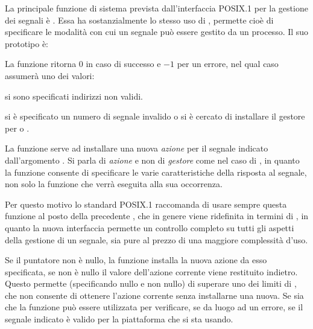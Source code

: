 La principale funzione di sistema prevista dall'interfaccia POSIX.1 per la
gestione dei segnali è . Essa ha sostanzialmente lo stesso
uso di , permette cioè di specificare le modalità con cui un
segnale può essere gestito da un processo. Il suo prototipo è:

\begin{funcproto}{
}

{La funzione ritorna $0$ in caso di successo e $-1$ per un errore, nel qual
  caso  assumerà uno dei valori: 
  \begin{errlist}
  \item[\errcode{EFAULT}] si sono specificati indirizzi non validi.
  \item[\errcode{EINVAL}] si è specificato un numero di segnale invalido o si è
    cercato di installare il gestore per  o
    .
  \end{errlist}
}
\end{funcproto}

La funzione serve ad installare una nuova \textsl{azione} per il segnale
indicato dall'argomento . Si parla di \textsl{azione} e non di
\textsl{gestore} come nel caso di , in quanto la funzione
consente di specificare le varie caratteristiche della risposta al segnale,
non solo la funzione che verrà eseguita alla sua occorrenza.  

Per questo motivo lo standard POSIX.1 raccomanda di usare sempre questa
funzione al posto della precedente , che in genere viene
ridefinita in termini di , in quanto la nuova interfaccia
permette un controllo completo su tutti gli aspetti della gestione di un
segnale, sia pure al prezzo di una maggiore complessità d'uso.

Se il puntatore  non è nullo, la funzione installa la nuova azione
da esso specificata, se  non è nullo il valore dell'azione
corrente viene restituito indietro.  Questo permette (specificando 
nullo e  non nullo) di superare uno dei limiti di ,
che non consente di ottenere l'azione corrente senza installarne una nuova. Se
sia  che  la funzione può essere utilizzata per
verificare, se da luogo ad un errore, se il segnale indicato è valido per la
piattaforma che si sta usando.


